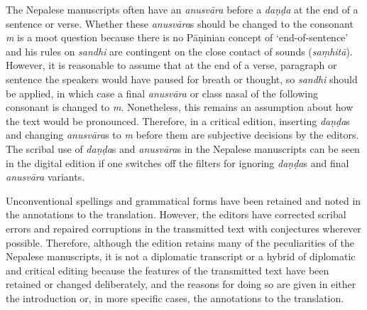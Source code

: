The Nepalese manuscripts often have an \emph{anusvāra} before a 
\emph{daṇḍa} at the end of a sentence or verse. Whether these 
\emph{anusvāra}s should be changed to the consonant \emph{m} is a moot 
question because there is no Pāṇinian concept of `end-of-sentence' and his rules 
on \emph{sandhi} are contingent on the close contact of  sounds 
(\emph{saṃhitā}). However, it is reasonable to assume that at the end 
of a verse, paragraph or sentence the speakers would have paused for breath or 
thought, so \emph{sandhi} should be applied, in which case a final 
\emph{anusvāra} or class nasal of the following consonant is changed to 
\emph{m}.  Nonetheless, this remains an assumption about how the text would 
be pronounced. Therefore, in a critical edition, inserting \emph{daṇḍa}s and 
changing \emph{anusvāra}s to \emph{m} before them are subjective decisions 
by the editors. The scribal use of \emph{daṇḍa}s and \emph{anusvāra}s in the 
Nepalese manuscripts can be seen in the digital edition if one switches off the 
filters for ignoring \emph{daṇḍa}s and final \emph{anusvāra} variants. 

Unconventional spellings and grammatical forms have been retained and noted in 
the annotations to the translation. However, the editors have corrected scribal 
errors and repaired corruptions in the transmitted text with conjectures wherever 
possible. Therefore, although the edition retains many of the peculiarities of the 
Nepalese manuscripts, it is not a diplomatic transcript or a hybrid of diplomatic 
and critical editing because the features of the transmitted text have been 
retained or changed deliberately, and the reasons for doing so are given in either 
the introduction or, in more specific cases, the annotations to the translation.

